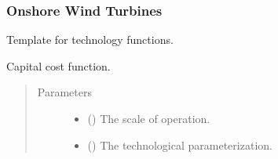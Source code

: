 \documentclass[letterpaper,10pt,english]{sphinxmanual}
\begin{document}
\subsubsection{Onshore Wind Turbines}
\label{\detokenize{technology:module-technology.tutorial_basic}}\label{\detokenize{technology:onshore-wind-turbines}}
Template for technology functions.

\begin{fulllineitems}
\label{\detokenize{technology:technology.tutorial_basic.capital_cost}}
Capital cost function.
\begin{quote}\begin{description}
\item[{Parameters}] \leavevmode\begin{itemize}
\item {} 
 () \textendash{} The scale of operation.

\item {} 
 () \textendash{} The technological parameterization.

\end{itemize}

\end{description}\end{quote}

\end{fulllineitems}

\end{document}
